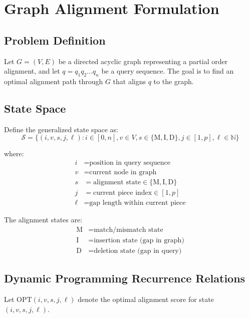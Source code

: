 \documentclass[11pt]{article}
\begin{document}
\section{Graph Alignment Formulation}

\subsection{Problem Definition}

Let $G = (V, E)$ be a directed acyclic graph representing a partial order alignment, and let $q = q_1q_2...q_n$ be a query sequence. The goal is to find an optimal alignment path through $G$ that aligns $q$ to the graph.

\subsection{State Space}

Define the generalized state space as:
\begin{equation}
\mathcal{S} = \{(i, v, s, j, \ell) : i \in [0,n], v \in V, s \in \{\text{M}, \text{I}, \text{D}\}, j \in [1,p], \ell \in \mathbb{N}\}
\end{equation}

where:
\begin{align}
i &= \text{position in query sequence} \\
v &= \text{current node in graph} \\
s &= \text{alignment state} \in \{\text{M}, \text{I}, \text{D}\} \\
j &= \text{current piece index} \in [1, p] \\
\ell &= \text{gap length within current piece}
\end{align}

The alignment states are:
\begin{align}
\text{M} &= \text{match/mismatch state} \\
\text{I} &= \text{insertion state (gap in graph)} \\
\text{D} &= \text{deletion state (gap in query)}
\end{align}

\subsection{Dynamic Programming Recurrence Relations}

Let $\text{OPT}(i, v, s, j, \ell)$ denote the optimal alignment score for state $(i, v, s, j, \ell)$.
\end{document}
